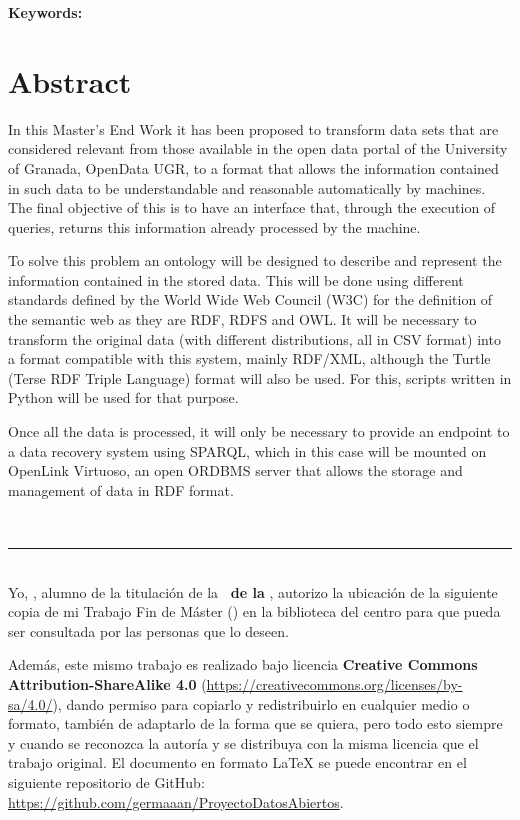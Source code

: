 \textbf{Keywords: }{\keywordsEn}

\section*{Abstract}

In this {\sf Master's End Work} it has been proposed to transform data sets that are considered relevant from those available in the open data portal of the {\sf University of Granada}, {\sf OpenData UGR}, to a format that allows the information contained in such data to be understandable and reasonable automatically by machines. The final objective of this is to have an interface that, through the execution of queries, returns this information already processed by the machine.
\bigskip

To solve this problem an ontology will be designed to describe and represent the information contained in the stored data. This will be done using different standards defined by the {\sf World Wide Web Council (W3C)} for the definition of the semantic web as they are {\sf RDF}, {\sf RDFS} and {\sf OWL}. It will be necessary to transform the original data (with different distributions, all in {\sf CSV} format) into a format compatible with this system, mainly {\sf RDF/XML}, although the {\sf Turtle (Terse RDF Triple Language)} format will also be used. For this, scripts written in {\sf Python} will be used for that purpose.

\bigskip
Once all the data is processed, it will only be necessary to provide an endpoint to a data recovery system using {\sf SPARQL}, which in this case will be mounted on {\sf OpenLink Virtuoso}, an open {\sf ORDBMS} server that allows the storage and management of data in {\sf RDF format}.

\newpage
\thispagestyle{empty}
\
\vspace{3cm}

\noindent\rule[-1ex]{\textwidth}{2pt}\\[4.5ex]

Yo, \textbf{\autor}, alumno de la titulación \textbf{\master} de la \textbf{\escuela\ de la \universidad}, autorizo la ubicación de la siguiente copia de mi Trabajo Fin de Máster (\textit{\titulo}) en la biblioteca del centro para que pueda ser consultada por las personas que lo deseen.

\bigskip
Además, este mismo trabajo es realizado bajo licencia \textbf{Creative Commons Attribution-ShareAlike 4.0} (\url{https://creativecommons.org/licenses/by-sa/4.0/}), dando permiso para copiarlo y redistribuirlo en cualquier medio o formato, también de adaptarlo de la forma que se quiera, pero todo esto siempre y cuando se reconozca la autoría y se distribuya con la misma licencia que el trabajo original. El documento en formato {\sf LaTeX} se puede encontrar en el siguiente repositorio de {\sf GitHub}: \url{https://github.com/germaaan/ProyectoDatosAbiertos}.

